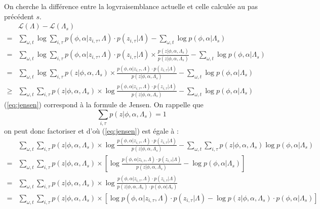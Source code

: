 \documentclass[a4paper,12pt]{article}
\begin{document}
On cherche la différence entre la logvraisemblance actuelle et celle calculée au pas précédent $s$.
\begin{align}
& \mathcal{L}(\Lambda) - \mathcal{L}(\Lambda_s) & \nonumber \\
= & \displaystyle\sum_{\omega,t} \log \displaystyle\sum_{i, \tau} p(\phi, \alpha | z_{i, \tau}, \Lambda) \cdot p(z_{i, \tau} | \Lambda) - \displaystyle\sum_{\omega,t} \log p(\phi, \alpha | \Lambda_s) \nonumber\\
= & \displaystyle\sum_{\omega,t} \log \displaystyle\sum_{i, \tau} p(\phi, \alpha | z_{i, \tau}, \Lambda) \cdot p(z_{i, \tau} | \Lambda) \times \frac{p(z|\phi,\alpha,\Lambda_s)}{p(z|\phi,\alpha,\Lambda_s)}- \displaystyle\sum_{\omega,t} \log p(\phi, \alpha | \Lambda_s) \nonumber\\
= & \displaystyle\sum_{\omega,t} \log \displaystyle\sum_{i, \tau} p(z|\phi,\alpha,\Lambda_s) \times \frac{p(\phi, \alpha | z_{i, \tau}, \Lambda) \cdot p(z_{i, \tau} | \Lambda)}{p(z|\phi,\alpha,\Lambda_s)}- \displaystyle\sum_{\omega,t} \log p(\phi, \alpha | \Lambda_s) \nonumber\\
\geq & \displaystyle\sum_{\omega,t} \displaystyle\sum_{i, \tau} p(z|\phi,\alpha,\Lambda_s) \times \log \frac{p(\phi, \alpha | z_{i, \tau}, \Lambda) \cdot p(z_{i, \tau} | \Lambda)}{p(z|\phi,\alpha,\Lambda_s)}- \displaystyle\sum_{\omega,t} \log p(\phi, \alpha | \Lambda_s) \label{eq:jensen}
\end{align}
(\ref{eq:jensen}) correspond à la formule de Jensen. On rappelle que
\begin{equation*}
\displaystyle \sum_{i,\tau} p(z|\phi,\alpha,\Lambda_s) = 1
\end{equation*}
on peut donc factoriser et d'où (\ref{eq:jensen}) est égale à :
\begin{align}
& \displaystyle\sum_{\omega,t} \displaystyle\sum_{i, \tau} p(z|\phi,\alpha,\Lambda_s) \times \log \frac{p(\phi, \alpha | z_{i, \tau}, \Lambda) \cdot p(z_{i, \tau} | \Lambda)}{p(z|\phi,\alpha,\Lambda_s)}- \displaystyle\sum_{\omega,t}\displaystyle\sum_{i, \tau} p(z|\phi,\alpha,\Lambda_s) \log p(\phi, \alpha | \Lambda_s) \nonumber \\
= & \displaystyle\sum_{\omega,t} \displaystyle\sum_{i, \tau} p(z|\phi,\alpha,\Lambda_s) \times [ \log \frac{p(\phi, \alpha | z_{i, \tau}, \Lambda) \cdot p(z_{i, \tau} | \Lambda)}{p(z|\phi,\alpha,\Lambda_s)}-\log p(\phi, \alpha | \Lambda_s) ] \nonumber \\
= & \displaystyle\sum_{\omega,t} \displaystyle\sum_{i, \tau} p(z|\phi,\alpha,\Lambda_s) \times \log \frac{p(\phi, \alpha | z_{i, \tau}, \Lambda) \cdot p(z_{i, \tau} | \Lambda)}{p(z|\phi,\alpha,\Lambda_s) \cdot p(\phi, \alpha | \Lambda_s)}  \nonumber \\
= & \displaystyle\sum_{\omega,t} \displaystyle\sum_{i, \tau} p(z|\phi,\alpha,\Lambda_s) \times [\log p(\phi, \alpha | z_{i, \tau}, \Lambda) \cdot p(z_{i, \tau} | \Lambda) - \log p(z|\phi,\alpha,\Lambda_s) \cdot p(\phi, \alpha | \Lambda_s)] \nonumber
\end{align}
\end{document}
